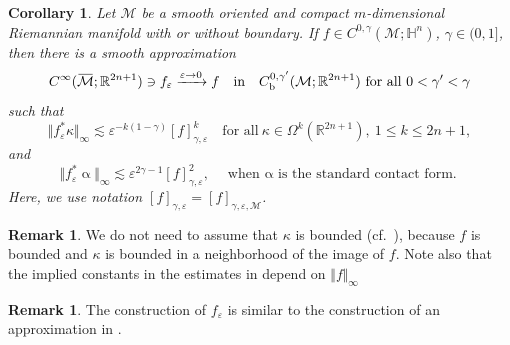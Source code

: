 \documentclass[intlimits,12pt,reqno]{amsart}
\newcommand{\cM}{\mathcal M}
\newcommand{\bbbh}{\mathbb H}
\newcommand{\R}{\mathbb R}
\newcommand{\overbar}[1]{\mkern 1.7mu\overline{\mkern-1.7mu#1\mkern-1.5mu}\mkern 1.5mu}
\newcommand{\eps}{\varepsilon}
\numberwithin{equation}{section}
\newtheorem{corollary}[theorem]{Corollary}
\theoremstyle{definition}
\newtheorem{remark}[theorem]{Remark}
\begin{document}
\begin{corollary}
\label{T50}
Let $\cM$ be a smooth oriented and compact $m$-dimensional Riemannian manifold with or without boundary. If $f\in C^{0,\gamma}(\cM;\bbbh^n)$, $\gamma\in (0,1]$, then there is a smooth approximation 
$$
C^\infty(\overbar{\cM};\R^{2n+1})\ni f_\eps \xrightarrow{\eps\to 0} f
\quad
\text{in}
\quad
C_{\rm b}^{0,\gamma'}(\cM;\R^{2n+1})\ 
\text{for all $0<\gamma'<\gamma$}
$$
such that
$$
\Vert f_\eps^*\kappa\Vert_\infty \lesssim \eps^{-k(1-\gamma)}[f]^k_{\gamma,\eps}
\quad
\text{for all}\ 
\kappa\in\Omega^k \left(\R^{2n+1}\right),\ 1\leq k\leq 2n+1,
$$
and
$$
\Vert f_\eps^*\upalpha\Vert_\infty \lesssim \eps^{2\gamma-1}[f]^2_{\gamma,\eps},
\quad
\text{when $\upalpha$ is the standard contact form.}
$$
Here, we use notation $[f]_{\gamma,\eps}=[f]_{\gamma,\eps,\cM}$. 
\end{corollary}
\begin{remark}
We do not need to assume that $\kappa$ is bounded (cf.\ ), because $f$ is bounded and $\kappa$ is bounded in a neighborhood of the image of $f$. Note also that the implied constants in the estimates in  depend on $\Vert f\Vert_\infty$ 
\end{remark}
\begin{remark}
The construction of $f_\eps$ is similar to the construction of an approximation in .
\end{remark}
\end{document}
